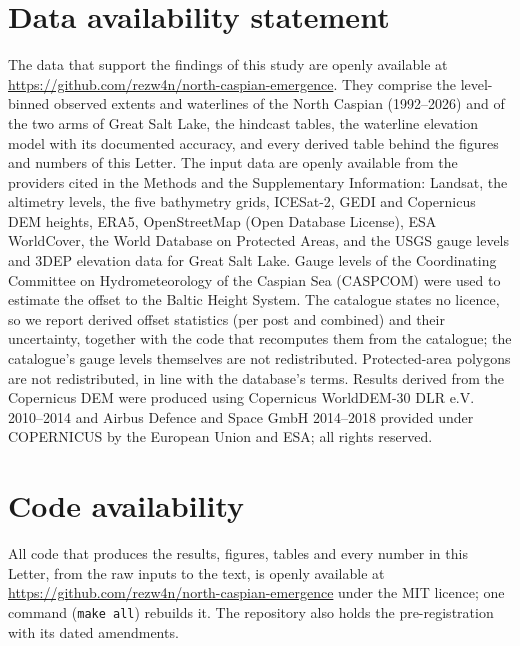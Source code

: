 
\section*{Data availability statement}
The data that support the findings of this study are openly available at \url{https://github.com/rezw4n/north-caspian-emergence}. They comprise the level-binned observed extents and waterlines of the North Caspian (1992--2026) and of the two arms of Great Salt Lake, the hindcast tables, the waterline elevation model with its documented accuracy, and every derived table behind the figures and numbers of this Letter. The input data are openly available from the providers cited in the Methods and the Supplementary Information: Landsat, the altimetry levels, the five bathymetry grids, ICESat-2, GEDI and Copernicus DEM heights, ERA5, OpenStreetMap (Open Database License), ESA WorldCover, the World Database on Protected Areas, and the USGS gauge levels and 3DEP elevation data for Great Salt Lake. Gauge levels of the Coordinating Committee on Hydrometeorology of the Caspian Sea (CASPCOM) were used to estimate the offset to the Baltic Height System. The catalogue states no licence, so we report derived offset statistics (per post and combined) and their uncertainty, together with the code that recomputes them from the catalogue; the catalogue's gauge levels themselves are not redistributed\citep{caspcom2026}. Protected-area polygons are not redistributed, in line with the database's terms. Results derived from the Copernicus DEM were produced using Copernicus WorldDEM-30 \textcopyright{} DLR e.V. 2010--2014 and \textcopyright{} Airbus Defence and Space GmbH 2014--2018 provided under COPERNICUS by the European Union and ESA; all rights reserved.

\section*{Code availability}
All code that produces the results, figures, tables and every number in this Letter, from the raw inputs to the text, is openly available at \url{https://github.com/rezw4n/north-caspian-emergence} under the MIT licence; one command (\texttt{make all}) rebuilds it. The repository also holds the pre-registration with its dated amendments.


